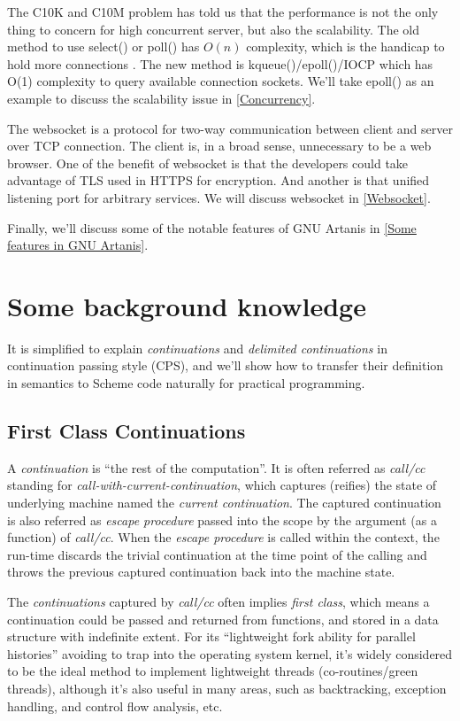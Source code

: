 \documentclass[numbers,numberedpars]{sigplanconf}
\begin{document}
The C10K and C10M problem has told us that the performance is not the only thing to concern for high concurrent server, but also the scalability.  
The old method to use select() or poll() has $O(n)$ complexity, which is the handicap to hold more connections \citep{lemon2001kqueue}.
The new method is kqueue()/epoll()/IOCP which has O(1) complexity to query available connection sockets. We'll take epoll() as an example to
discuss the scalability issue in \ref{Concurrency}.

The websocket is a protocol for two-way communication between client and server over TCP connection. The client is, in a broad sense,
unnecessary to be a web browser. One of the benefit of websocket is that the developers could take advantage of TLS used in HTTPS for
encryption. And another is that unified listening port for arbitrary services. We will discuss websocket in \ref{Websocket}.

Finally, we'll discuss some of the notable features of GNU Artanis in \ref{Some features in GNU Artanis}.

\section{Some background knowledge}

It is simplified to explain {\it continuations} and {\it delimited continuations} in continuation passing style (CPS), and we'll show how to
transfer their definition in semantics to Scheme code naturally for practical programming.

\subsection{First Class Continuations}

A {\it continuation} is ``the rest of the computation''. It is often referred as {\it call/cc} standing for
{\it call-with-current-continuation}, which captures (reifies) the state of underlying machine named the {\it current continuation}.
The captured continuation is also referred as {\it escape procedure} passed into the scope by the argument (as a function) of {\it call/cc}.
When the {\it escape procedure} is called within the context, the run-time discards the trivial
continuation at the time point of the calling and throws the previous captured continuation back into the machine state.

The {\it continuations} captured by {\it call/cc} often implies {\it first class}, which means a continuation
could be passed and returned from functions, and stored in a data structure with indefinite extent.
For its ``lightweight fork ability for parallel histories'' avoiding to trap into the operating system kernel, it's widely considered
to be the ideal method to implement lightweight threads (co-routines/green threads), although it's also useful in many areas, such as
backtracking, exception handling, and control flow analysis, etc.
\end{document}
